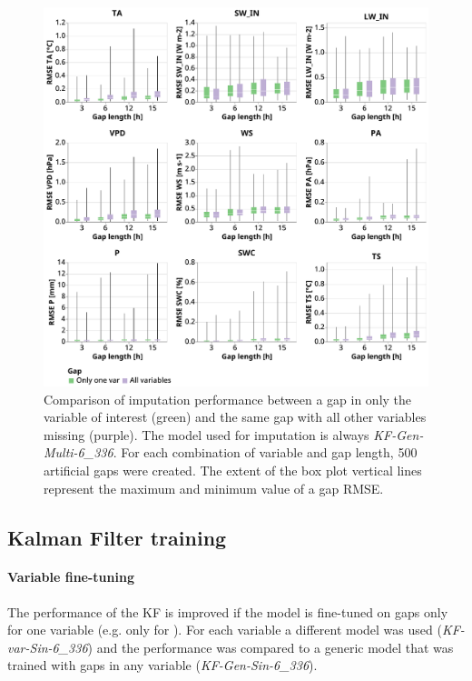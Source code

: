 \documentclass{article}
\newcommand{\imgwidth}{6in}
\let\Oldsubsection\subsection
\renewcommand{\subsection}{\FloatBarrier\Oldsubsection}
\begin{document}
\begin{figure}
\centerline{\includegraphics[width=\imgwidth]{gap_single_var}}
\caption{Comparison of imputation performance between a gap in only the variable of interest (green) and the same gap with all other variables missing (purple). The model used for imputation is always \textit{KF-Gen-Multi-6\_336}. For each combination of variable and gap length, 500 artificial gaps were created. The extent of the box plot vertical lines represent the maximum and minimum value of a gap RMSE.}
\label{fig:gap_single_var}
\end{figure}

\subsection{Kalman Filter training}

\paragraph{Variable fine-tuning} The performance of the KF is improved if the model is fine-tuned on gaps only for one variable (e.g. only for ).
For each variable a different model was used (\textit{KF-\textlangle var\textrangle-Sin-6\_336}) and the performance was compared to a generic model that was trained with gaps in any variable (\textit{KF-Gen-Sin-6\_336}).
\end{document}
